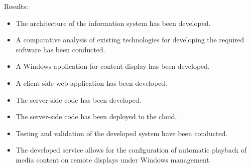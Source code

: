 Results:
\begin{itemize}
    \item The architecture of the information system has been developed.
    \item A comparative analysis of existing technologies for developing the required software has been conducted.
    \item A Windows application for content display has been developed.
    \item A client-side web application has been developed.
    \item The server-side code has been developed.
    \item The server-side code has been deployed to the cloud.
    \item Testing and validation of the developed system have been conducted.
    \item The developed service allows for the configuration of automatic playback of media content on remote displays under Windows management.
\end{itemize}

\thispagestyle{empty}
%
